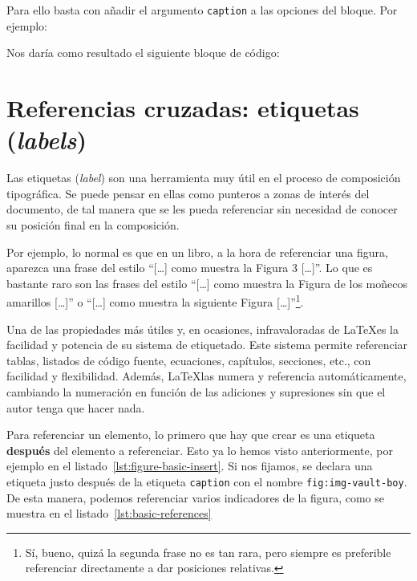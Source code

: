 Para ello basta con añadir el argumento \texttt{caption} a las opciones del bloque. Por ejemplo:



Nos daría como resultado el siguiente bloque de código:
 


\section{Referencias cruzadas: etiquetas (\textit{labels})}

Las etiquetas (\textit{label}) son una herramienta muy útil en el proceso de composición tipográfica. Se puede pensar en ellas como punteros a zonas de interés del documento, de tal manera que se les pueda referenciar sin necesidad de conocer su posición final en la composición.

Por ejemplo, lo normal es que en un libro, a la hora de referenciar una figura, aparezca una frase del estilo ``[\ldots] como muestra la Figura 3 [\ldots]''. Lo que es bastante raro son las frases del estilo ``[\ldots] como muestra la Figura de los moñecos amarillos [\ldots]'' o ``[\ldots] como muestra la siguiente Figura [\ldots]''\footnote{Sí, bueno, quizá la segunda frase no es tan rara, pero siempre es preferible referenciar directamente a dar posiciones relativas.}.

Una de las propiedades más útiles y, en ocasiones, infravaloradas de \LaTeX es la facilidad y potencia de su sistema de etiquetado. Este sistema permite referenciar tablas, listados de código fuente, ecuaciones, capítulos, secciones, etc., con facilidad y flexibilidad. Además, \LaTeX las numera y referencia automáticamente, cambiando la numeración en función de las adiciones y supresiones sin que el autor tenga que hacer nada.

Para referenciar un elemento, lo primero que hay que crear es una etiqueta \textbf{después} del elemento a referenciar. Esto ya lo hemos visto anteriormente, por ejemplo en el listado~\ref{lst:figure-basic-insert}. Si nos fijamos, se declara una etiqueta justo después de la etiqueta \texttt{caption} con el nombre \texttt{fig:img-vault-boy}. De esta manera, podemos referenciar varios indicadores de la figura, como se muestra en el listado~\ref{lst:basic-references}

